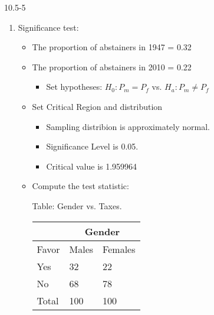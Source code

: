 \begin{exsol@solution}{10.5-5}

  	  \begin{enumerate}
	 \item Significance test:


\begin{itemize}
\item The proportion of abstainers in 1947 = 0.32
\item The proportion of abstainers in 2010 = 0.22
  \begin{itemize}
  \item Set hypotheses: $H_0: P_m = P_f$ vs. $H_a: P_m \ne P_f$
  \end{itemize}

\item Set Critical Region and distribution

  \begin{itemize}
  \item Sampling distribion is approximately normal.
  \item Significance Level is 0.05.
  \item Critical value is 1.959964
  \end{itemize}

\item Compute the test statistic:

\begin{minipage}[h]{6cm}

Table: Gender vs. Taxes.



      \begin{tabular}{@{} p{2.5cm} p{1cm} p{1cm} @{}} \hline %
     &  \multicolumn{2}{c}{Gender } \\ \hline
     Favor   & Males & Females \\ \hline
     Yes   & 32 & 22 \\
     No          & 68 & 78 \\ \hline
     Total        & 100 & 100 \\ \hline
   \end{tabular}

\end{minipage} \hfill
\begin{minipage}[h]{6cm}


\end{minipage}
\end{itemize}
\end{enumerate}
\end{exsol@solution}
